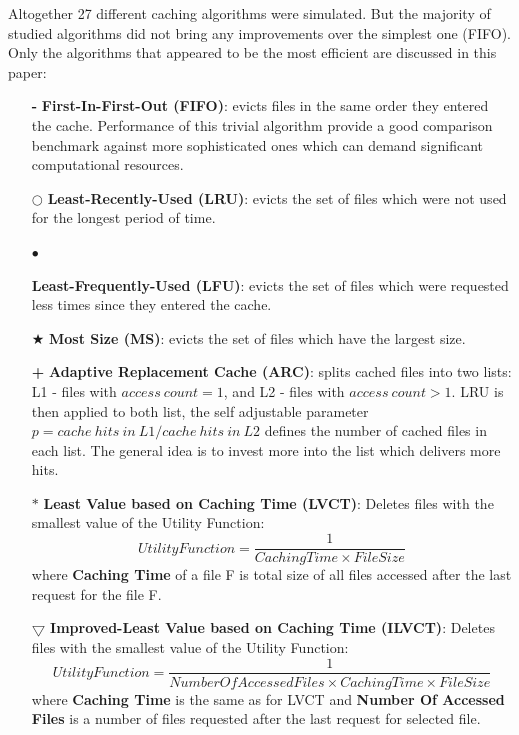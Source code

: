 \documentclass[english]{ddny}
\begin{document}
Altogether 27 different caching algorithms were simulated. But the majority of studied algorithms did not bring any improvements over the simplest one (FIFO). Only the algorithms that appeared to be the most efficient are discussed in this paper: 
\begin{itemize}
\item[\textbf{-}]\textbf{First-In-First-Out (FIFO)}: evicts files in the same order they entered the cache. Performance of this trivial algorithm  provide a good comparison benchmark against  more sophisticated ones  which can demand  significant computational resources.
\item[$\bigcirc $]\textbf{Least-Recently-Used (LRU)}: evicts the set of files which were not used for the longest period of time.
\item[\begin{Large}$\bullet $\end{Large}]\textbf{Least-Frequently-Used (LFU)}: evicts the set of files which were requested less times since they entered the cache.
\item[$\bigstar $] \textbf{Most Size (MS)}: evicts the set of files which have the largest size.
\item[\textbf{+}]\textbf{Adaptive Replacement Cache (ARC)}\cite{ARC}: splits cached files into two lists: L1 - files with $access~count=1$, and L2 - files with $access~count>1$. LRU is then applied to both list, the self adjustable parameter $p = cache~hits~in~L1 / cache~hits~in~L2$ defines the number of cached files in each list. The general idea is to invest more into the list which delivers more hits.
\item[$\ast $]{\textbf{Least Value based on Caching Time (LVCT)}}\cite{Cache in Grid}: Deletes files with the smallest value of the  Utility Function:
\begin{equation}
Utility Function = \frac{1}{Caching Time \times File Size}
\end{equation}   
where \textbf{Caching Time} of a file F is total size of all files accessed after the last request for the file F.
\item[$\bigtriangledown $]{\textbf{Improved-Least Value based on Caching Time (ILVCT)}}\cite{Improved-Least Value based on Caching Time}: Deletes files with the smallest value of the  Utility Function:
\begin{equation}
Utility Function = \frac{1}{Number Of Accessed Files \times Caching Time \times File Size}
\end{equation}   
where \textbf{Caching Time} is the same as for LVCT and \textbf{Number Of Accessed Files}  is a number of files requested after the last request for selected file. 
\end{itemize}
\end{document}
